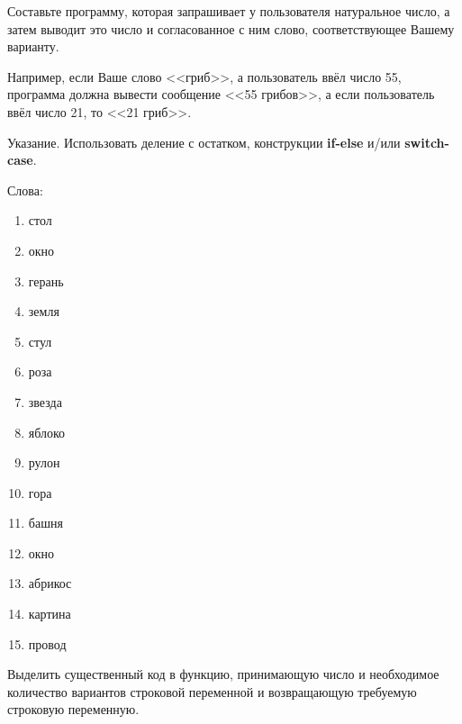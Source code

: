 
\labtask

Составьте программу, которая запрашивает у пользователя натуральное число, а затем выводит это число и согласованное с ним слово, соответствующее Вашему варианту.

Например, если Ваше слово <<гриб>>, а пользователь ввёл число 55, программа должна вывести сообщение <<55 грибов>>, а если пользователь ввёл число 21, то <<21 гриб>>.

Указание. Использовать деление с остатком, конструкции \textbf{if-else} и/или \textbf{switch-case}.

Слова:

\begin{enumerate}

\item стол

\item окно

\item  герань

\item  земля

\item  стул

\item  роза

\item  звезда

\item  яблоко

\item  рулон

\item  гора

\item  башня

\item  окно

\item  абрикос

\item  картина

\item  провод



\end{enumerate}


\labtask

Выделить существенный код в функцию, принимающую число и необходимое количество вариантов строковой переменной и возвращающую требуемую строковую переменную.

